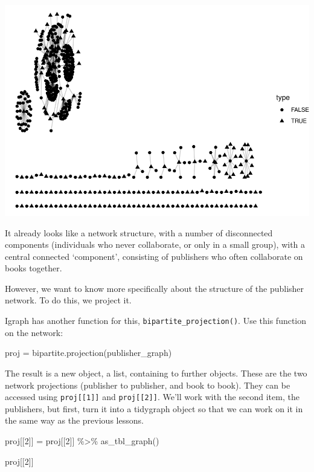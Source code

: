 \documentclass[
]{book}
\newenvironment{Shaded}{\begin{snugshade}}{\end{snugshade}}
\newcommand{\DecValTok}[1]{\textcolor[rgb]{0.00,0.00,0.81}{#1}}
\newcommand{\FunctionTok}[1]{\textcolor[rgb]{0.00,0.00,0.00}{#1}}
\newcommand{\NormalTok}[1]{#1}
\newcommand{\OtherTok}[1]{\textcolor[rgb]{0.56,0.35,0.01}{#1}}
\newcommand{\SpecialCharTok}[1]{\textcolor[rgb]{0.00,0.00,0.00}{#1}}
\begin{document}
\includegraphics{_main_files/figure-latex/unnamed-chunk-77-1.pdf}

It already looks like a network structure, with a number of disconnected components (individuals who never collaborate, or only in a small group), with a central connected `component', consisting of publishers who often collaborate on books together.

However, we want to know more specifically about the structure of the publisher network. To do this, we project it.

Igraph has another function for this, \texttt{bipartite\_projection()}. Use this function on the network:

\begin{Shaded}
\begin{Highlighting}[]
\NormalTok{proj }\OtherTok{=} \FunctionTok{bipartite.projection}\NormalTok{(publisher\_graph)}
\end{Highlighting}
\end{Shaded}

The result is a new object, a list, containing to further objects. These are the two network projections (publisher to publisher, and book to book). They can be accessed using \texttt{proj{[}{[}1{]}{]}} and \texttt{proj{[}{[}2{]}{]}}. We'll work with the second item, the publishers, but first, turn it into a tidygraph object so that we can work on it in the same way as the previous lessons.

\begin{Shaded}
\begin{Highlighting}[]
\NormalTok{proj[[}\DecValTok{2}\NormalTok{]] }\OtherTok{=}\NormalTok{ proj[[}\DecValTok{2}\NormalTok{]] }\SpecialCharTok{\%\textgreater{}\%} \FunctionTok{as\_tbl\_graph}\NormalTok{()}

\NormalTok{proj[[}\DecValTok{2}\NormalTok{]] }
\end{Highlighting}
\end{Shaded}
\end{document}
